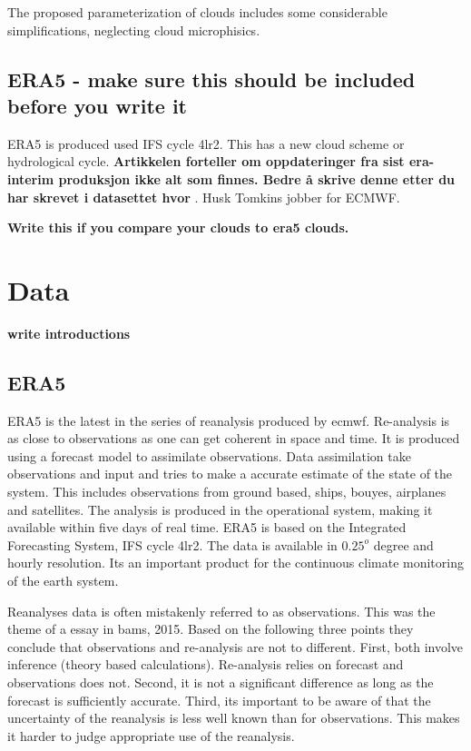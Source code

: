 The proposed parameterization of clouds includes some considerable simplifications, neglecting cloud microphisics. 


\subsection{ERA5 - make sure this should be included before you write it} \label{sec:param_ERA5}
ERA5 is produced used IFS cycle 4lr2. This has a new cloud scheme or hydrological cycle. \textbf{Artikkelen forteller om oppdateringer fra sist era-interim produksjon ikke alt som finnes. Bedre å skrive denne etter du har skrevet i datasettet hvor }. Husk Tomkins jobber for ECMWF.

\textbf{Write this if you compare your clouds to era5 clouds.}

\section{Data}
\textbf{write introductions}


\subsection{ERA5} \label{sec:era5}
ERA5 is the latest in the series of reanalysis produced by \acrfull{ecmwf}. Re-analysis is as close to observations as one can get coherent in space and time. It is produced using a forecast model to assimilate observations. Data assimilation take observations and input and tries to make a accurate estimate of the state of the system. This includes observations from ground based, ships, bouyes, airplanes and satellites. The analysis is produced in the operational system, making it available within five days of real time. ERA5 is based on the Integrated Forecasting System, IFS cycle 4lr2. The data is available in $0.25^o$ degree and hourly resolution. Its an important product for the continuous climate monitoring of the earth system. 

Reanalyses data is often mistakenly referred to as observations. This was the theme of a essay in \acrfull{bams}, 2015. Based on the following three points they conclude that observations and re-analysis are not to different. First, both involve inference (theory based calculations). Re-analysis relies on forecast and observations does not. Second, it is not a significant difference as long as the forecast is sufficiently accurate. Third, its important to be aware of that the uncertainty of the reanalysis is less well known than for observations. This makes it harder to judge appropriate use of the reanalysis. 

